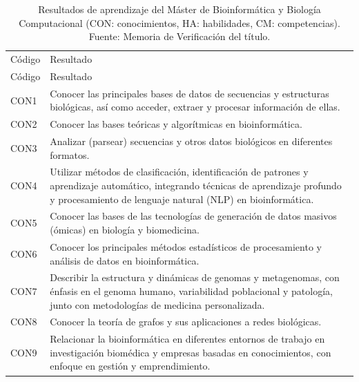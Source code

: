 \documentclass[
  11pt,
  a4paper,
  twoside]{scrreprt}
\begin{document}
\begin{longtable}{
p{1.5cm}
p{12.5cm}}

\caption{\label{tbl-MUBBC}Resultados de aprendizaje del Máster de
Bioinformática y Biología Computacional (CON: conocimientos, HA:
habilidades, CM: competencias). Fuente: Memoria de Verificación del
título.}

\tabularnewline

  \\
\hline
Código & Resultado \\
\hline
\endfirsthead
\hline
Código & Resultado \\
\hline
\endhead

CON1 & Conocer las principales bases de datos de secuencias y estructuras biológicas, así como acceder, extraer y procesar información de ellas. \\
CON2 & Conocer las bases teóricas y algorítmicas en bioinformática. \\
CON3 & Analizar (parsear) secuencias y otros datos biológicos en diferentes formatos. \\
CON4 & Utilizar métodos de clasificación, identificación de patrones y aprendizaje automático, integrando técnicas de aprendizaje profundo y procesamiento de lenguaje natural (NLP) en bioinformática. \\
CON5 & Conocer las bases de las tecnologías de generación de datos masivos (ómicas) en biología y biomedicina. \\
CON6 & Conocer los principales métodos estadísticos de procesamiento y análisis de datos en bioinformática. \\
CON7 & Describir la estructura y dinámicas de genomas y metagenomas, con énfasis en el genoma humano, variabilidad poblacional y patología, junto con metodologías de medicina personalizada. \\
CON8 & Conocer la teoría de grafos y sus aplicaciones a redes biológicas. \\
CON9 & Relacionar la bioinformática en diferentes entornos de trabajo en investigación biomédica y empresas basadas en conocimientos, con enfoque en gestión y emprendimiento. \\


\end{longtable}
\end{document}

